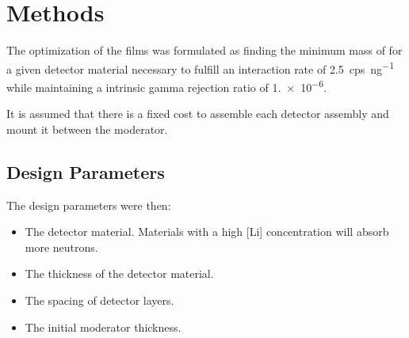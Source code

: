 \section{Methods}
\label{sec:Methodes}


The optimization of the films was formulated as finding the minimum mass of  for a given detector material necessary to fulfill an interaction rate of \SI{2.5}{cps\per\nano\gram{}} while maintaining a intrinsic gamma rejection ratio of \num{1.e-6}.

It is assumed that there is a fixed cost to assemble each detector assembly and mount it between the moderator.


\subsection{Design Parameters}
\label{sec:DesignParameters}
The design parameters were then:
\begin{itemize}
  \item The detector material. Materials with a high [Li] concentration will absorb more neutrons.
  \item The thickness of the detector material.
  \item The spacing of detector layers.
  \item The initial moderator thickness.
\end{itemize}

